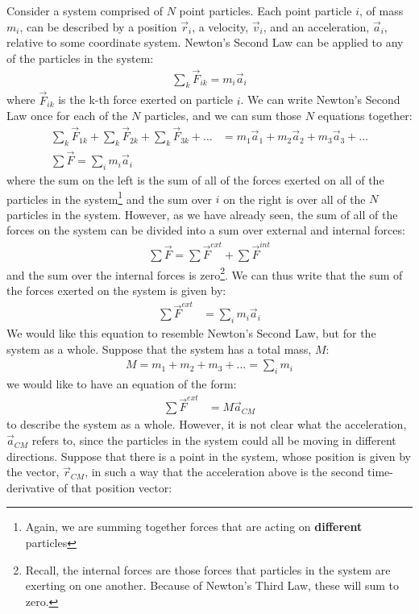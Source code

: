 Consider a system comprised of $N$ point particles. Each point particle $i$, of mass $m_i$, can be described by a position $\vec r_i$, a velocity, $\vec v_i$, and an acceleration, $\vec a_i$, relative to some coordinate system. Newton's Second Law can be applied to any of the particles in the system:
\begin{align*}
\sum_k \vec F_{ik} = m_i \vec a_i
\end{align*}
where $\vec F_{ik}$ is the k-th force exerted on particle $i$. We can write Newton's Second Law once for each of the $N$ particles, and we can sum those $N$ equations together:
\begin{align*}
\sum_k \vec F_{1k} + \sum_k \vec F_{2k} + \sum_k \vec F_{3k} +\dots &= m_1\vec a_1 + m_2 \vec a_2 + m_3 \vec a_3 + \dots\\
\sum \vec F = \sum_i m_i \vec a_i 
\end{align*}
where the sum on the left is the sum of all of the forces exerted on all of the particles in the system\footnote{Again, we are summing together forces that are acting on \textbf{different} particles} and the sum over $i$ on the right is over all of the $N$ particles in the system. However, as we have already seen, the sum of all of the forces on the system can be divided into a sum over external and internal forces:
\begin{align*}
\sum \vec F = \sum \vec F^{ext} + \sum \vec F^{int} 
\end{align*}
and the sum over the internal forces is zero\footnote{Recall, the internal forces are those forces that particles in the system are exerting on one another. Because of Newton's Third Law, these will sum to zero.}. We can thus write that the sum of the forces exerted on the system is given by:
\begin{align}
\label{eqn:momentumandcm:cmtemp1}
\sum \vec F^{ext}&= \sum_i m_i \vec a_i
\end{align}
We would like this equation to resemble Newton's Second Law, but for the system as a whole. Suppose that the system has a total mass, $M$:
\begin{align*}
M = m_1 + m_2 + m_3 +\dots = \sum_i m_i
\end{align*}
we would like to have an equation of the form:
\begin{align}
\label{eqn:momentumandcm:cmtemp2}
\sum \vec F^{ext}&=M\vec a_{CM}
\end{align}
to describe the system as a whole. However, it is not clear what the acceleration, $\vec a_{CM}$ refers to, since the particles in the system could all be moving in different directions. Suppose that there is a point in the system, whose position is given by the vector, $\vec r_{CM}$, in such a way that the acceleration above is the second time-derivative of that position vector:
